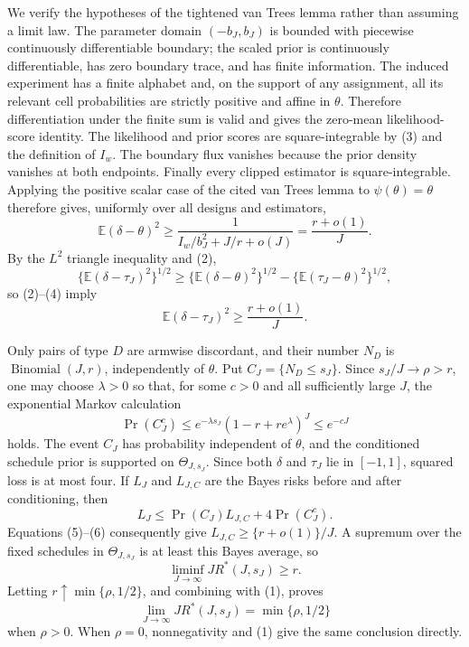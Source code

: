 We verify the hypotheses of the tightened van Trees lemma rather than assuming a limit law.  The parameter domain \((-b_J,b_J)\) is bounded with piecewise continuously differentiable boundary; the scaled prior is continuously differentiable, has zero boundary trace, and has finite information.  The induced experiment has a finite alphabet and, on the support of any assignment, all its relevant cell probabilities are strictly positive and affine in \(\theta\).  Therefore differentiation under the finite sum is valid and gives the zero-mean likelihood-score identity.  The likelihood and prior scores are square-integrable by (3) and the definition of \(I_w\).  The boundary flux vanishes because the prior density vanishes at both endpoints.  Finally every clipped estimator is square-integrable.  Applying the positive scalar case of the cited van Trees lemma to \(\psi(\theta)=\theta\) therefore gives, uniformly over all designs and estimators,
\[
 \mathbb E(\delta-\theta)^2
 \ge \frac1{I_w/b_J^2+J/r+o(J)}
 =\frac{r+o(1)}J.
 \tag{4}
\]
By the \(L^2\) triangle inequality and (2),
\[
 \{\mathbb E(\delta-\tau_J)^2\}^{1/2}
 \ge
 \{\mathbb E(\delta-\theta)^2\}^{1/2}
 -\{\mathbb E(\tau_J-\theta)^2\}^{1/2},
\]
so (2)--(4) imply
\[
 \mathbb E(\delta-\tau_J)^2\ge\frac{r+o(1)}J.
 \tag{5}
\]

Only pairs of type \(D\) are armwise discordant, and their number \(N_D\) is \(\operatorname{Binomial}(J,r)\), independently of \(\theta\).  Put \(C_J=\{N_D\le s_J\}\).  Since \(s_J/J\to\rho>r\), one may choose \(\lambda>0\) so that, for some \(c>0\) and all sufficiently large \(J\), the exponential Markov calculation
\[
 \Pr(C_J^c)
 \le e^{-\lambda s_J}(1-r+re^\lambda)^J
 \le e^{-cJ}
 \tag{6}
\]
holds.  The event \(C_J\) has probability independent of \(\theta\), and the conditioned schedule prior is supported on \(\Theta_{J,s_J}\).  Since both \(\delta\) and \(\tau_J\) lie in \([-1,1]\), squared loss is at most four.  If \(L_J\) and \(L_{J,C}\) are the Bayes risks before and after conditioning, then
\[
 L_J
 \le \Pr(C_J)L_{J,C}+4\Pr(C_J^c).
\]
Equations (5)--(6) consequently give \(L_{J,C}\ge\{r+o(1)\}/J\).  A supremum over the fixed schedules in \(\Theta_{J,s_J}\) is at least this Bayes average, so
\[
 \liminf_{J\to\infty}J R^*(J,s_J)\ge r.
\]
Letting \(r\uparrow\min\{\rho,1/2\}\), and combining with (1), proves
\[
 \lim_{J\to\infty}J R^*(J,s_J)=\min\{\rho,1/2\}
\]
when \(\rho>0\).  When \(\rho=0\), nonnegativity and (1) give the same conclusion directly.

